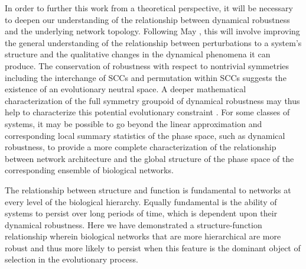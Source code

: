 In order to further this work from a theoretical perspective, it will be necessary to deepen our understanding of the relationship between dynamical robustness and the underlying network topology. Following May \cite{Cohen1984,May1972a,Radius2014,Majumdar2014}, this will involve improving the general understanding of the relationship between perturbations to a system's structure and the qualitative changes in the dynamical phenomena it can produce. The conservation of robustness with respect to nontrivial symmetries including the interchange of SCCs and permutation within SCCs suggests the existence of an evolutionary neutral space. A deeper mathematical characterization of the full symmetry groupoid of dynamical robustness may thus help to characterize this potential evolutionary constraint \cite{Golubitsky2006}.
For some classes of systems, it may be possible to go beyond the linear approximation and corresponding local summary statistics of the phase space, such as dynamical robustness, to provide a more complete characterization of the relationship between network architecture and the global structure of the phase space of the corresponding ensemble of biological networks.

The relationship between structure and function is fundamental to networks at every level of the biological hierarchy. Equally fundamental is the ability of systems to persist over long periods of time, which is dependent upon their dynamical robustness. Here we have demonstrated a structure-function relationship wherein biological networks that are more hierarchical are more robust and thus more likely to persist when this feature is the dominant object of selection in the evolutionary process.
